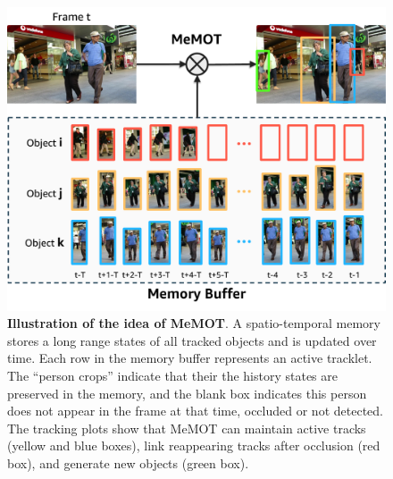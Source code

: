 \begin{figure}
    \centering
    \includegraphics[width=0.97\linewidth]{figures/teaser.pdf}  
    \vspace{-4.5mm}
    \caption{\textbf{Illustration of the idea of MeMOT}.
    A spatio-temporal memory stores a long range states of all tracked objects and is updated over time.
    Each row in the memory buffer represents an active tracklet.
    The ``person crops'' indicate that their the history states are preserved in the memory, and the blank box indicates this person does not appear in the frame at that time, occluded or not detected.
    The tracking plots show that MeMOT can maintain active tracks (yellow and blue boxes), link reappearing tracks after occlusion (red box), and generate new objects (green box).}
    \vspace{-2.5mm}
    \label{fig:teaser}
\end{figure}

